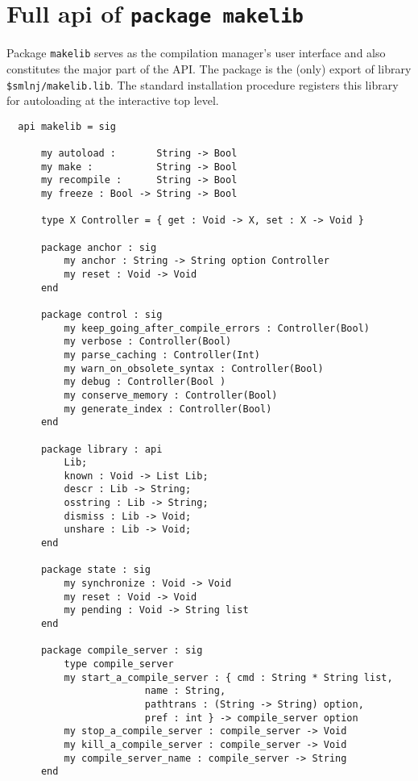 
\section{Full api of {\tt package makelib}}

Package {\tt makelib} serves as the compilation manager's user interface
and also constitutes the major part of the API.  The package is the
(only) export of library {\tt \$smlnj/makelib.lib}.  The standard
installation procedure registers this library for
autoloading at the interactive top level.

\begin{small}
\begin{verbatim}
  api makelib = sig

      my autoload :       String -> Bool
      my make :           String -> Bool
      my recompile :      String -> Bool
      my freeze : Bool -> String -> Bool

      type X Controller = { get : Void -> X, set : X -> Void }

      package anchor : sig
          my anchor : String -> String option Controller
          my reset : Void -> Void
      end

      package control : sig
          my keep_going_after_compile_errors : Controller(Bool)
          my verbose : Controller(Bool)
          my parse_caching : Controller(Int)
          my warn_on_obsolete_syntax : Controller(Bool) 
          my debug : Controller(Bool )
          my conserve_memory : Controller(Bool) 
          my generate_index : Controller(Bool) 
      end

      package library : api
          Lib;
          known : Void -> List Lib;
          descr : Lib -> String;
          osstring : Lib -> String;
          dismiss : Lib -> Void;
          unshare : Lib -> Void;
      end

      package state : sig
          my synchronize : Void -> Void
          my reset : Void -> Void
          my pending : Void -> String list
      end

      package compile_server : sig
          type compile_server
          my start_a_compile_server : { cmd : String * String list,
                        name : String,
                        pathtrans : (String -> String) option,
                        pref : int } -> compile_server option
          my stop_a_compile_server : compile_server -> Void
          my kill_a_compile_server : compile_server -> Void
          my compile_server_name : compile_server -> String
      end


\end{verbatim}
\end{small}
